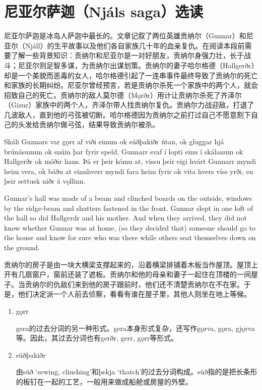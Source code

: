 \section{尼亚尔萨迦（Njáls saga）选读}
尼亚尔萨迦是冰岛人萨迦中最长的。文章记叙了两位英雄贡纳尔（Gunnar）和尼亚尔（Njáll）的生平故事以及他们各自家族几十年的血亲复仇。在阅读本段前需要了解一些背景知识：贡纳尔和尼亚尔是一对好朋友，贡纳尔身强力壮，长于战斗；尼亚尔则足智多谋，为贡纳尔出谋划策。贡纳尔的妻子哈尔格德（Hallgerðr）却是一个美貌而恶毒的女人，哈尔格德引起了一连串事件最终导致了贡纳尔的死亡和家族的长期纠纷。尼亚尔曾经预言，若是贡纳尔杀死一个家族中的两个人，就会招致自己的死亡。贡纳尔的敌人莫尔德（Mǫrðr）用计让贡纳尔杀死了齐泽尔（Gizur）家族中的两个人，齐泽尔带人找贡纳尔复仇。贡纳尔力战迎敌，打退了几波敌人，直到他的弓弦被切断。哈尔格德因为贡纳尔之前打过自己不愿意割下自己的头发给贡纳尔做弓弦，结果导致贡纳尔被杀。
\begin{paracol}{2}
  Skáli Gunnars var gǫrr af viði einum ok súðþakiðr útan, ok gluggar hjá brúnásunum ok snúin þar fyrir speld. Gunnarr svaf í lopti einu í skálanum ok Hallgerðr ok móðir hans. Þá er þeir kómu at, vissu þeir eigi hvárt Gunnarr myndi heim vera, ok báðu at einnhverr myndi fara heim fyrir ok vita hvers víss yrði, en þeir settusk niðr á vǫllinn.

  \switchcolumn

  Gunnar's hall was made of a beam and clinched boards on the outside, windows by the ridge-beam and shutters fastened in the front. Gunnar slept in one loft of the hall so did Hallgerdr and his mother. And when they arrived, they did not know whether Gunnar was at home, (so they decided that) someone should go to the house and know for sure who was there while others seat themselves down on the ground.
\end{paracol}
\begin{translation*}{}
  贡纳尔的房子是由一块大横梁支撑起来的，沿着横梁排铺着木板当作屋顶。屋顶上开有几扇窗户，窗前还装了遮板。贡纳尔和他的母亲和妻子一起住在顶楼的一间屋子。当贡纳尔的仇敌们来到他的房子跟前时，他们还不清楚贡纳尔在不在家。于是，他们决定派一个人前去侦察，看看有谁在屋子里，其他人则坐在地上等候。
\end{translation*}
\begin{grammar*}{}
  \begin{enumerate}[leftmargin=*]
    \item gǫrr

          gera的过去分词的另一种形式。gera本身形式复杂，还写作gǫrva, gǫra, gjǫrva等。因此，其过去分词也有gerðr, gerr, gǫrr等形式。

    \item súðþakiðr

          由súð `sewing, clinching'和þekja `thatch'的过去分词构成。súð指的是把长条形的板钉在一起的工艺，一般用来做成船舱或房屋的外壁。
  \end{enumerate}
\end{grammar*}

